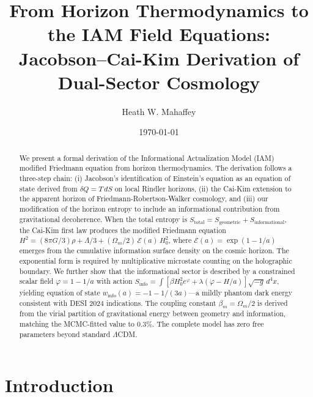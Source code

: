 \documentclass[aps,prd,twocolumn,superscriptaddress,nofootinbib]{revtex4-2}
\begin{document}
\title{From Horizon Thermodynamics to the IAM Field Equations:\\
Jacobson--Cai-Kim Derivation of Dual-Sector Cosmology}

\author{Heath W. Mahaffey}

\date{\today}

\begin{abstract}
We present a formal derivation of the Informational Actualization Model (IAM) modified Friedmann equation from horizon thermodynamics. The derivation follows a three-step chain: (i) Jacobson's identification of Einstein's equation as an equation of state derived from $\delta Q = T\,dS$ on local Rindler horizons, (ii) the Cai-Kim extension to the apparent horizon of Friedmann-Robertson-Walker cosmology, and (iii) our modification of the horizon entropy to include an informational contribution from gravitational decoherence. When the total entropy is $S_\text{total} = S_\text{geometric} + S_\text{informational}$, the Cai-Kim first law produces the modified Friedmann equation $H^2 = (8\pi G/3)\rho + \Lambda/3 + (\Omega_m/2)\,\mathcal{E}(a)\,H_0^2$, where $\mathcal{E}(a) = \exp(1-1/a)$ emerges from the cumulative information surface density on the cosmic horizon. The exponential form is required by multiplicative microstate counting on the holographic boundary. We further show that the informational sector is described by a constrained scalar field $\varphi = 1-1/a$ with action $S_\text{info} = \int[\beta H_0^2 e^{\varphi} + \lambda(\dot{\varphi} - H/a)]\sqrt{-g}\,d^4x$, yielding equation of state $w_\text{info}(a) = -1 - 1/(3a)$---a mildly phantom dark energy consistent with DESI 2024 indications. The coupling constant $\beta_m = \Omega_m/2$ is derived from the virial partition of gravitational energy between geometry and information, matching the MCMC-fitted value to 0.3\%. The complete model has zero free parameters beyond standard $\Lambda$CDM.
\end{abstract}

\maketitle

\section{Introduction}
\label{sec:intro}
\end{document}
